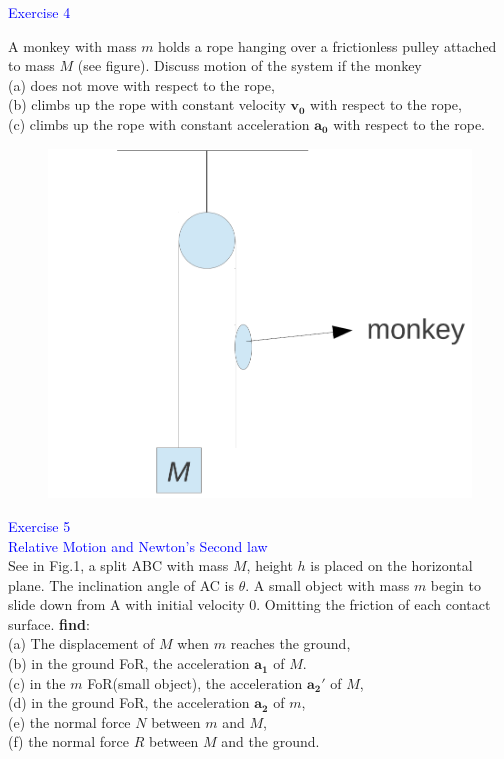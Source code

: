 \documentclass{beamer}
\begin{document}
\begin{frame}
\textcolor{blue}{Exercise 4}

A monkey with mass $m$ holds a rope hanging over a frictionless pulley attached to mass $M$ (see
figure). Discuss motion of the system if the monkey\\
(a) does not move with respect to the rope,\\
(b) climbs up the rope with constant velocity $\mathbf{v_0}$ with respect to the rope,\\
(c) climbs up the rope with constant acceleration $\mathbf{a_0}$ with respect to the rope.
\begin{figure}[htbp]
\centering
\includegraphics[width=0.4 \linewidth, angle =0]{ex4.png}
\label{fig:4}
\end{figure}
\end{frame}

\begin{frame}
\textcolor{blue}{Exercise 5}\\
\textcolor{blue}{\footnotesize{Relative Motion and Newton's Second law}}\\

See in Fig.1, a split ABC with mass $M$, height $h$ is placed on the horizontal plane. The inclination angle of AC is $\theta$. A small object with mass $m$ begin to slide down from A with initial velocity 0. Omitting the friction of each contact surface. \textbf{find}:\\
(a) The displacement of $M$ when $m$ reaches the ground,\\
(b) in the ground FoR, the acceleration $\mathbf{a_1}$ of $M$.\\
(c) in the $m$ FoR(small object), the acceleration $\mathbf{a_2'}$ of $M$,\\
(d) in the ground FoR, the acceleration $\mathbf{a_2}$ of $m$,\\
(e) the normal force $N$ between $m$ and $M$,\\
(f) the normal force $R$ between $M$ and the ground.
\end{frame}
\end{document}
